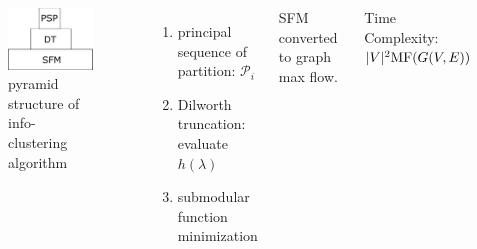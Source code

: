 \documentclass{beamer}
\DeclarePairedDelimiter\abs{\lvert}{\rvert}
\def\P{\mathcal{P}}
\begin{document}
\begin{frame}
\begin{columns}
\column{5cm}
\begin{figure}[!ht]
\centering
\includegraphics[width=5cm]{pic/pyramid.eps}
\caption{pyramid structure of info-clustering algorithm}\label{fig:ps}
\end{figure}
\column{5cm}
\begin{enumerate}
\item principal sequence of partition: $\P_i$
\item Dilworth truncation: evaluate $h(\lambda)$
\item submodular function minimization
\end{enumerate}
SFM converted to graph max flow.

Time Complexity: $\abs{V}^2 \mathrm{MF}(G(V,E))$
\end{columns}
\end{frame}
\end{document}
